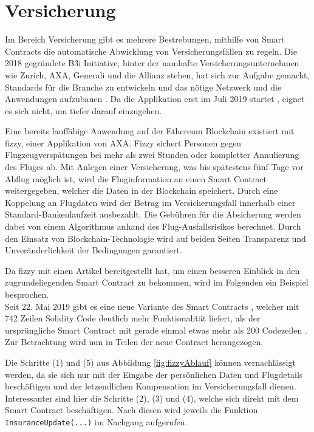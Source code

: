 \chapter{Versicherung}
\label{chap:Versicherung}
Im Bereich Versicherung gibt es mehrere Bestrebungen, mithilfe von Smart Contracts die automatische Abwicklung von Versicherungsfällen zu regeln. Die 2018 gegründete B3i Initiative, hinter der namhafte Versicherungsunternehmen wie Zurich, AXA, Generali und die Allianz stehen, hat sich zur Aufgabe gemacht, Standards für die Branche zu entwickeln und das nötige Netzwerk und die Anwendungen aufzubauen \cite[vgl.][]{B3iWhoWeAre2019}. Da die Applikation erst im Juli 2019 startet \cite[vgl.][]{B3iHackathon2019}, eignet es sich nicht, um tiefer darauf einzugehen.

Eine bereits lauffähige Anwendung auf der Ethereum Blockchain existiert mit fizzy, einer Applikation von AXA. Fizzy sichert Personen gegen Flugzeugverspätungen bei mehr als zwei Stunden oder kompletter Annulierung des Fluges ab. Mit Anlegen einer Versicherung, was bis spätestens fünf Tage vor Abflug möglich ist, wird die Fluginformation an einen Smart Contract weitergegeben, welcher die Daten in der Blockchain speichert. Durch eine Koppelung an Flugdaten wird der Betrag im Versicherungsfall innerhalb einer Standard-Bankenlaufzeit ausbezahlt. Die Gebühren für die Absicherung werden dabei von einem Algorithmus anhand des Flug-Ausfallsrisikos berechnet. Durch den Einsatz von Blockchain-Technologie wird auf beiden Seiten Transparenz und Unveränderlichkeit der Bedingungen garantiert. \cite[vgl.][]{Fizzy2019}

Da fizzy mit \cite{Clement2019} einen Artikel bereitgestellt hat, um einen besseren Einblick in den zugrundeliegenden Smart Contract zu bekommen, wird im Folgenden ein Beispiel besprochen.\\
Seit 22. Mai 2019 gibt es eine neue Variante des Smart Contracts \cite{EtherscanNewContract2019}, welcher mit 742 Zeilen Solidity Code deutlich mehr Funktionalität liefert, als der ursprüngliche Smart Contract mit gerade einmal etwas mehr als 200 Codezeilen \cite{EtherscanOldContract2019}. Zur Betrachtung wird nun in Teilen der neue Contract herangezogen.

Die Schritte (1) und (5) aus Abbildung \ref{fig:fizzyAblauf} können vernachlässigt werden, da sie sich nur mit der Eingabe der persönlichen Daten und Flugdetails beschäftigen und der letzendlichen Kompensation im Versicherungsfall dienen. Interessanter sind hier die Schritte (2), (3) und (4), welche sich direkt mit dem Smart Contract beschäftigen. Nach diesen wird jeweils die Funktion \texttt{InsuranceUpdate(...)} im Nachgang aufgerufen.\clearpage

